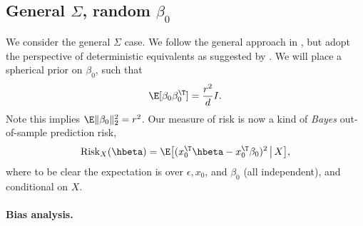 \documentclass{article}
\begin{document}
\subsection{General $\Sigma$, random $\beta_0$}

We consider the general $\Sigma$ case. We follow the general approach in
\citet{dobriban2018high}, but adopt the perspective of deterministic equivalents
as suggested by \citet{dobriban2021distributed}. We will place a spherical prior on $\beta_0$,
such that       
\begin{equation}
\label{eq:prior}
\E[\beta_0 \beta_0^\T] = \frac{r^2}{d} I.
\end{equation}
Note this implies $\E \|\beta_0\|_2^2 = r^2$. Our measure of risk is now a kind
of \emph{Bayes} out-of-sample prediction risk,  
\begin{equation}
\label{eq:ridge_risk_bayes}
\Risk_X(\hbeta) = \E \big[ ( x_0^\T \hbeta - x_0^\T \beta_0 )^2 \,\big|\,
X \big],
\end{equation}
where to be clear the expectation is over $\epsilon, x_0$, and $\beta_0$ (all
independent), and conditional on $X$. 

\paragraph{Bias analysis.}
\end{document}
